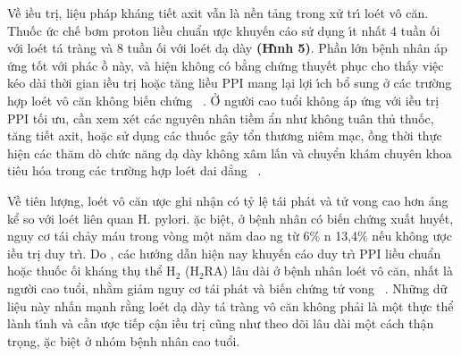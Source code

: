 \documentclass[9pt,twocolumn]{article}
\begin{document}
Về \text{\dj}iều tr\d{i}, li{\^{\d{e}}}u ph\'{a}p kh\'{a}ng ti{{\'{\^{e}}}}t axit vẫn l\`{a} nền tảng trong xử tr\'{\i} lo{\'e}t v{\^o} c{\u{a}}n. Thuốc ức ch{{\'{\^{e}}}} bơm proton liều chuẩn \text{\dj}ược khuy{{\'{\^{e}}}}n c\'{a}o sử d\d{u}ng \'{\i}t nhất 4 tuần \text{\dj}ối với lo{\'e}t t\'{a} tr\`{a}ng v\`{a} 8 tuần \text{\dj}ối với lo{\'e}t d{\d{a}} d\`{a}y \textbf{(H\`{\i}nh 5)}. Phần lớn b{\^{\d{e}}}nh nh\^{a}n \text{\dj}\'{a}p ứng tốt với ph\'{a}c \text{\dj}ồ n\`{a}y, v\`{a} hi{\^{\d{e}}}n kh{\^o}ng c{\'{o}} bằng chứng thuy{{\'{\^{e}}}}t ph\d{u}c cho thấy vi{\^{\d{e}}}c k{\'e}o d\`{a}i thời gian \text{\dj}iều tr\d{i} hoặc t{\u{a}}ng liều PPI mang l{\d{a}}i lợi \'{\i}ch bổ sung ở c\'{a}c trường hợp lo{\'e}t v{\^o} c{\u{a}}n kh{\^o}ng bi{{\'{\^{e}}}}n chứng\unskip~\cite{2901310:34531806,2901310:34531814,2901310:34531818} . Ở người cao tuổi kh{\^o}ng \text{\dj}\'{a}p ứng với \text{\dj}iều tr\d{i} PPI tối ưu, cần xem x{\'e}t c\'{a}c nguy{\^{e}}n nh\^{a}n tiềm ẩn như kh{\^o}ng tu\^{a}n thủ thuốc, t{\u{a}}ng ti{{\'{\^{e}}}}t axit, hoặc sử d\d{u}ng c\'{a}c thuốc g\^{a}y tổn thương ni{\^{e}}m m{\d{a}}c, \text{\dj}ồng thời thực hi{\^{\d{e}}}n c\'{a}c th{\u{a}}m d\`{o} chức n{\u{a}}ng d{\d{a}} d\`{a}y kh{\^o}ng x\^{a}m lấn v\`{a} chuyển kh\'{a}m chuy{\^{e}}n khoa ti{\^{e}}u h{\'{o}}a trong c\'{a}c trường hợp lo{\'e}t dai dẳng\unskip~\cite{2901310:34531813,2901310:34531814}  .

Về ti{\^{e}}n lượng, lo{\'e}t v{\^o} c{\u{a}}n \text{\dj}ược ghi nh{\^{\d{a}}}n c{\'{o}} tỷ l{\^{\d{e}}} t\'{a}i ph\'{a}t v\`{a} tử vong cao hơn \text{\dj}\'{a}ng kể so với lo{\'e}t li{\^{e}}n quan H. pylori. \text{\DJ}ặc bi{\^{\d{e}}}t, ở b{\^{\d{e}}}nh nh\^{a}n c{\'{o}} bi{{\'{\^{e}}}}n chứng xuất huy{{\'{\^{e}}}}t, nguy cơ t\'{a}i chảy m\'{a}u trong v\`{o}ng m{\^{\d{o}}}t n{\u{a}}m dao ng từ 6\% n 13,4\% n{{\'{\^{e}}}}u kh{\^o}ng \text{\dj}ược \text{\dj}iều tr\d{i} duy tr\`{\i}. Do , c\'{a}c hướng dẫn hi{\^{\d{e}}}n nay khuy{{\'{\^{e}}}}n c\'{a}o duy tr\`{\i} PPI liều chuẩn hoặc thuốc \text{\dj}ối kh\'{a}ng th\d{u} thể H\ensuremath{_{\text{2}}} (H\ensuremath{_{2}}RA) l\^{a}u d\`{a}i ở b{\^{\d{e}}}nh nh\^{a}n lo{\'e}t v{\^o} c{\u{a}}n, nhất l\`{a} người cao tuổi, nhằm giảm nguy cơ t\'{a}i ph\'{a}t v\`{a} bi{{\'{\^{e}}}}n chứng tử vong\unskip~\cite{2901310:34531813,2901310:34531814} . Những dữ li{\^{\d{e}}}u n\`{a}y nhấn m{\d{a}}nh rằng lo{\'e}t d{\d{a}} d\`{a}y t\'{a} tr\`{a}ng v{\^o} c{\u{a}}n kh{\^o}ng phải l\`{a} m{\^{\d{o}}}t thực thể l\`{a}nh t\'{\i}nh v\`{a} cần \text{\dj}ược ti{{\'{\^{e}}}}p c{\^{\d{a}}}n \text{\dj}iều tr\d{i} c{\~{u}}ng như theo d{\~{o}}i l\^{a}u d\`{a}i m{\^{\d{o}}}t c\'{a}ch th{\^{\d{a}}}n tr\d{o}ng, \text{\dj}ặc bi{\^{\d{e}}}t ở nh{\'{o}}m b{\^{\d{e}}}nh nh\^{a}n cao tuổi.
\end{document}
